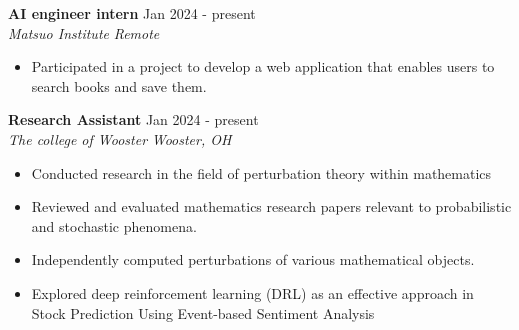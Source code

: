 \documentclass[a4paper,12pt]{article}
\begin{document}
\textbf{\large AI engineer intern} \hfill \textnormal{Jan 2024 - present}\\
\textit{Matsuo Institute} \hfill \textit{Remote}
\begin{itemize}
    \item Participated in a project to develop a web application that enables users to search books and save them.
\end{itemize}
\textbf{\large Research Assistant} \hfill \textnormal{Jan 2024 - present}\\
\textit{The college of Wooster} \hfill \textit{Wooster, OH}
\begin{itemize}
    \item Conducted research in the field of perturbation theory within mathematics
    \item Reviewed and evaluated mathematics research papers relevant to probabilistic and stochastic phenomena.
    \item Independently computed perturbations of various mathematical objects.
    \item Explored deep reinforcement learning (DRL) as an effective approach in Stock Prediction Using Event-based Sentiment Analysis
\end{itemize}
\end{document}
